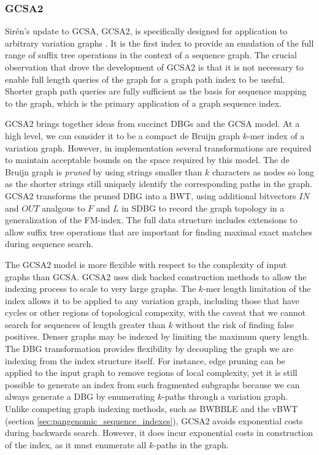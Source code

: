 \subsubsection{GCSA2}

Sir\'{e}n's update to GCSA, GCSA2, is specifically designed for application to arbitrary variation graphs \cite{siren2017indexing}.
It is the first index to provide an emulation of the full range of suffix tree operations in the context of a sequence graph.
The crucial observation that drove the development of GCSA2 is that it is not necessary to enable full length queries of the graph for a graph path index to be useful.
Shorter graph path queries are fully sufficient as the basis for sequence mapping to the graph, which is the primary application of a graph sequence index.

GCSA2 brings together ideas from succinct DBGs and the GCSA model.
At a high level, we can consider it to be a compact de Bruijn graph $k$-mer index of a variation graph.
However, in implementation several transformations are required to maintain acceptable bounds on the space required by this model.
The de Bruijn graph is \emph{pruned} by using strings smaller than $k$ characters as nodes so long as the shorter strings still uniquely identify the corresponding paths in the graph.
GCSA2 transforms the pruned DBG into a BWT, using additional bitvectors $IN$ and $OUT$ analgous to $F$ and $L$ in SDBG to record the graph topology in a generalization of the FM-index.
The full data structure includes extensions to allow suffix tree operations that are important for finding maximal exact matches during sequence search.

The GCSA2 model is more flexible with respect to the complexity of input graphs than GCSA.
GCSA2 uses disk backed construction methods to allow the indexing process to scale to very large graphs.
The $k$-mer length limitation of the index allows it to be applied to any variation graph, including those that have cycles or other regions of topological compexity, with the caveat that we cannot search for sequences of length greater than $k$ without the risk of finding false positives.
Denser graphs may be indexed by limiting the maximum query length.
The DBG transformation provides flexibility by decoupling the graph we are indexing from the index structure itself.
For instance, edge pruning can be applied to the input graph to remove regions of local complexity, yet it is still possible to generate an index from such fragmented subgraphs because we can always generate a DBG by enumerating $k$-paths through a variation graph.
Unlike competing graph indexing methods, such as BWBBLE and the vBWT (section \ref{sec:pangenomic_sequence_indexes}), GCSA2 avoids exponential costs during backwards search.
However, it does incur exponential costs in construction of the index, as it must enumerate all $k$-paths in the graph.

